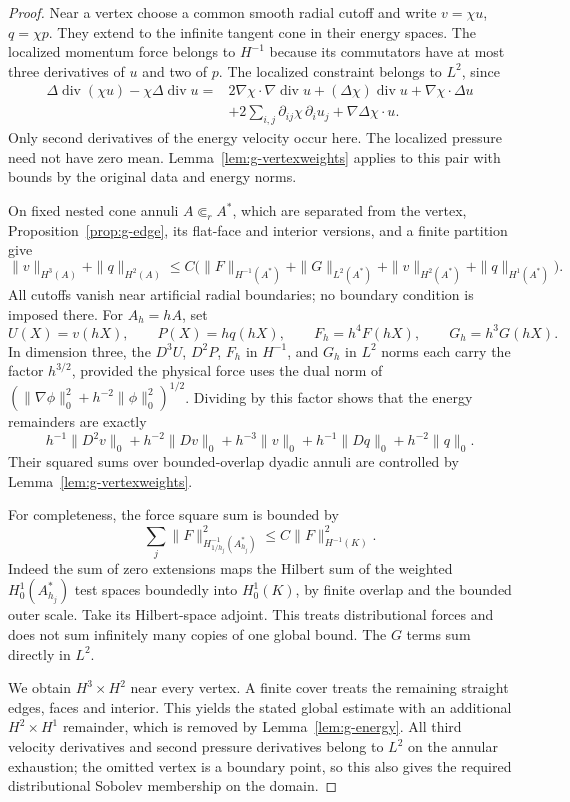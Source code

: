 \documentclass[11pt,a4paper]{article}
\theoremstyle{remark}
\numberwithin{equation}{section}
\begin{document}
\begin{proof}
Near a vertex choose a common smooth radial cutoff and write
$v=\chi u$, $q=\chi p$. They extend to the infinite tangent cone in their
energy spaces. The localized momentum force belongs to $H^{-1}$ because its
commutators have at most three derivatives of $u$ and two of $p$. The localized
constraint belongs to $L^2$, since
\[
 \begin{split}
 \Delta\operatorname{div}(\chi u)-\chi\Delta\operatorname{div}u
 ={}&2\nabla\chi\cdot\nabla\operatorname{div}u
 +(\Delta\chi)\operatorname{div}u+\nabla\chi\cdot\Delta u\\
 &+2\sum_{i,j}\partial_{ij}\chi\,\partial_i u_j
 +\nabla\Delta\chi\cdot u.
 \end{split}
\]
Only second derivatives of the energy velocity occur here. The localized
pressure need not have zero mean. Lemma~\ref{lem:g-vertexweights} applies to
this pair with bounds by the original data and energy norms.

On fixed nested cone annuli $A\Subset_r A^*$, which are separated from the
vertex, Proposition~\ref{prop:g-edge}, its flat-face and interior versions,
and a finite partition give
\[
 \|v\|_{H^3(A)}+\|q\|_{H^2(A)}
 \le C\bigl(\|F\|_{H^{-1}(A^*)}+\|G\|_{L^2(A^*)}
                  +\|v\|_{H^2(A^*)}+\|q\|_{H^1(A^*)}\bigr).
\]
All cutoffs vanish near artificial radial boundaries; no boundary condition
is imposed there. For $A_h=hA$, set
\[
 U(X)=v(hX),\qquad P(X)=h q(hX),\qquad
 F_h=h^4F(hX),\qquad G_h=h^3G(hX).
\]
In dimension three, the $D^3U$, $D^2P$, $F_h$ in $H^{-1}$, and $G_h$ in
$L^2$ norms each carry the factor $h^{3/2}$, provided the physical force uses
the dual norm of
$(\|\nabla\phi\|_0^2+h^{-2}\|\phi\|_0^2)^{1/2}$. Dividing by this factor
shows that the energy remainders are exactly
\[
 h^{-1}\|D^2v\|_0+h^{-2}\|Dv\|_0+h^{-3}\|v\|_0
 +h^{-1}\|Dq\|_0+h^{-2}\|q\|_0.
\]
Their squared sums over bounded-overlap dyadic annuli are controlled by
Lemma~\ref{lem:g-vertexweights}.

For completeness, the force square sum is bounded by
\begin{equation}\label{eq:g-force-dyadic-dual}
 \sum_j\|F\|_{H^{-1}_{1/h_j}(A_{h_j}^*)}^2
 \le C\|F\|_{H^{-1}(K)}^2.
\end{equation}
Indeed the sum of zero extensions maps the Hilbert sum of the weighted
$H^1_0(A_{h_j}^*)$ test spaces boundedly into $H^1_0(K)$, by finite overlap
and the bounded outer scale. Take its Hilbert-space adjoint. This treats
distributional forces and does not sum infinitely many copies of one global
bound. The $G$ terms sum directly in $L^2$.

We obtain $H^3\times H^2$ near every vertex. A finite cover treats the
remaining straight edges, faces and interior. This yields the stated global
estimate with an additional $H^2\times H^1$ remainder, which is removed by
Lemma~\ref{lem:g-energy}. All third velocity derivatives and second pressure
derivatives belong to $L^2$ on the annular exhaustion; the omitted vertex is
a boundary point, so this also gives the required distributional Sobolev
membership on the domain.
\end{proof}
\end{document}
